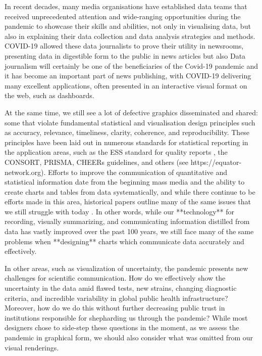 \documentclass[article]{jdssv}\usepackage[]{graphicx}\usepackage[]{xcolor}
\begin{document}
In recent decades, many media organisations have established data teams that received unprecedented attention and wide-ranging opportunities during the pandemic to showcase their skills and abilities, not only in visualising data, but also in explaining their data collection and data analysis strategies and methods. COVID-19 allowed these data journalists to prove their utility in newsrooms, presenting data in digestible form to the public in news articles but also Data journalism will certainly be one of the beneficiaries of the Covid-19 pandemic and it has become an important part of news publishing, with COVID-19 delivering many excellent applications, often presented in an interactive visual format on the web, such as dashboards\citep{kochWelcomeRevolutionCOVID192021}.


At the same time, we still see a lot of defective graphics disseminated and shared: some that violate fundamental statistical and visualisation design principles such as accuracy, relevance, timeliness, clarity, coherence, and reproducibility. 
These principles have been laid out in numerous standards for statistical reporting in the application areas, such as the ESS standard for quality reports \citep{ess2009}, the CONSORT, PRISMA, CHEERs guidelines, and others (see https://equator-network.org). 
Efforts to improve the communication of quantitative and statistical information date from the beginning mass media and the ability to create charts and tables from data systematically, and while there continue to be efforts made in this area, historical papers outline many of the same issues that we still struggle with today \citep{ASA-standards,haemerPresentationProblemsArea1949,kovermanPLANNINGVISUALPRESENTATION1961,fienbergGraphicalMethodsStatistics1979,Hoffrage2261,Tufte2001,Rosling2011,otavamylona2020}.
In other words, while our **technology** for recording, visually summarizing, and communicating information distilled from data has vastly improved over the past 100 years, we still face many of the same problems when **designing** charts which communicate data accurately and effectively.

In other areas, such as visualization of uncertainty, the pandemic presents new challenges for scientific communication. How do we effectively show the uncertainty in the data amid flawed tests, new strains, changing diagnostic criteria, and incredible variability in global public health infrastructure? Moreover, how do we do this without further decreasing public trust in institutions responsible for shepharding us through the pandemic? While most designers chose to side-step these questions in the moment, as we assess the pandemic in graphical form, we should also consider what was omitted from our visual renderings.
\end{document}

